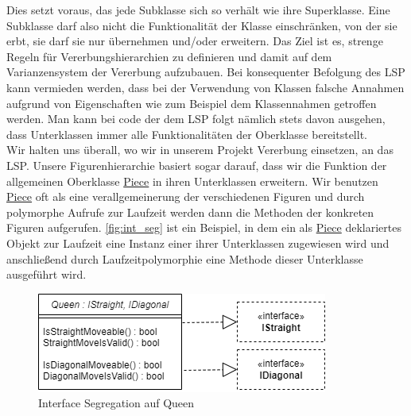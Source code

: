 \documentclass[
10pt, %
a4paper, %
oneside, %
headinclude,footinclude, %
BCOR5mm, %
]{scrartcl}
\begin{document}
\begin{onehalfspace}
Dies setzt voraus, das jede Subklasse sich so verhält wie ihre Superklasse. Eine Subklasse darf also nicht die Funktionalität der Klasse einschränken, von der sie erbt, sie darf sie nur übernehmen und/oder erweitern. Das Ziel ist es, strenge Regeln für Vererbungshierarchien zu definieren und damit auf dem Varianzensystem der Vererbung aufzubauen. Bei konsequenter Befolgung des LSP kann vermieden werden, dass bei der Verwendung von Klassen falsche Annahmen aufgrund von Eigenschaften wie zum Beispiel dem Klassennahmen getroffen werden. Man kann bei code der dem LSP folgt nämlich stets davon ausgehen, dass Unterklassen immer alle Funktionalitäten der Oberklasse bereitstellt.
\\
Wir halten uns überall, wo wir in unserem Projekt Vererbung einsetzen, an das LSP. Unsere Figurenhierarchie basiert sogar darauf, dass wir die Funktion der allgemeinen Oberklasse \href{https://github.com/schmida736/Chess-AdvancedSE/blob/main/Chess-AdvancedSE/Game\%20Elements/Pieces/Piece.cs}{Piece} in ihren Unterklassen erweitern. Wir benutzen \href{https://github.com/schmida736/Chess-AdvancedSE/blob/main/Chess-AdvancedSE/Game\%20Elements/Pieces/Piece.cs}{Piece} oft als eine verallgemeinerung der verschiedenen Figuren und durch polymorphe Aufrufe zur Laufzeit werden dann die Methoden der konkreten Figuren aufgerufen. \autoref{fig:int_seg} ist ein Beispiel, in dem ein als \href{https://github.com/schmida736/Chess-AdvancedSE/blob/main/Chess-AdvancedSE/Game\%20Elements/Pieces/Piece.cs}{Piece} deklariertes Objekt zur Laufzeit eine Instanz einer ihrer Unterklassen zugewiesen wird und anschließend durch Laufzeitpolymorphie eine Methode dieser Unterklasse ausgeführt wird.

\begin{figure}[ht]
	\centering
	\includegraphics[width=0.5\linewidth]{Diagonal_Straight.png}
	\caption[Interface Segregation auf Queen]{Interface Segregation auf Queen}
	\label{fig:int_seg}
\end{figure}


\end{onehalfspace}
\end{document}
